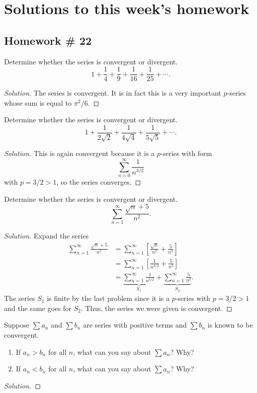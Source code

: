 \chapter{Solutions to this week's homework}
\section{Homework \# 22}
\begin{problem}[WebAssign HW \# 22, \# 1]
Determine whether the series is convergent or divergent.
\[
1+\frac{1}{4}+\frac{1}{9}+\frac{1}{16}+\frac{1}{25}+\cdots.
\]
\end{problem}
\begin{proof}[Solution]
The series is convergent. It is in fact this is a very important $p$-series
whose sum is equal to $\pi^2/6$.
\end{proof}

\begin{problem}[WebAssign HW \# 22, \# 2]
Determine whether the series is convergent or divergent.
\[
1+\frac{1}{2\sqrt{2}}+\frac{1}{4\sqrt{4}}+\frac{1}{5\sqrt{5}}+\cdots.
\]
\end{problem}
\begin{proof}[Solution]
This is again convergent because it is a $p$-series with form
\[
\sum_{n=0}^\infty\frac{1}{n^{3/2}}
\]
with $p=3/2>1$, so the series converges.
\end{proof}

\begin{problem}[WebAssign HW \# 22, \# 3]
Determine whether the series is convergent or divergent.
\[
\sum_{n=1}^\infty\frac{\sqrt{n}+5}{n^2}.
\]
\end{problem}
\begin{proof}[Solution]
Expand the series
\begin{align*}
\sum_{n=1}^\infty\frac{\sqrt{n}+5}{n^2}
&=\sum_{n=1}^\infty\left[\frac{\sqrt{n}}{n^2}+\frac{5}{n^2}\right]\\
&=\sum_{n=1}^\infty\left[\frac{1}{n^{3/2}}+\frac{5}{n^2}\right]\\
&=\underbrace{\sum_{n=1}^\infty\frac{1}{n^{3/2}}}_{S_1}
+\underbrace{\sum_{n=1}^\infty\frac{5}{n^2}}_{S_2}.
\end{align*}
The series $S_1$ is finite by the last problem since it is a $p$-series
with $p=3/2>1$ and the same goes for $S_2$. Thus, the series we were given
is convergent.
\end{proof}

\begin{problem}[WebAssign HW \# 22, \# 4]
Suppose $\sum a_n$ and $\sum b_n$ are series with positive terms and $\sum
b_n$ is known to be convergent.
\begin{enumerate}[label=(\alph*)]
\item If $a_n>b_n$ for all $n$, what can you say about $\sum a_n$? Why?
\item If $a_n<b_n$ for all $n$, what can you say about $\sum a_n$? Why?
\end{enumerate}
\end{problem}
\begin{proof}[Solution]
\end{proof}

